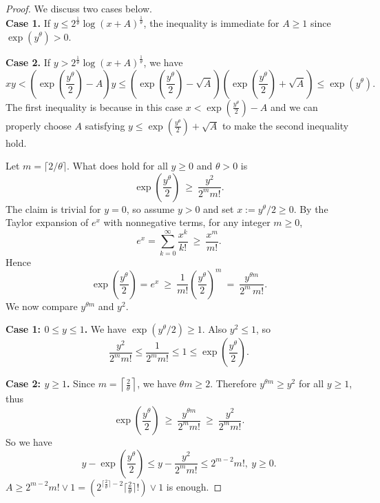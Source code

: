 \documentclass[11pt]{article}
\begin{document}
\begin{proof}
We discuss two cases below.\\ 

\textbf{Case 1.} If $y \leq 2^{\frac{1}{\theta}} \log(x + A)^{\frac{1}{\theta}}$, the inequality is immediate for $A\ge 1$ since $\exp(y^\theta)>0$.

\textbf{Case 2.} If $y > 2^{\frac{1}{\theta}} \log(x+A)^{\frac{1}{\theta}}$, we have
\[
xy < \left(\exp(\frac{y^\theta}{2}) - A \right) y \leq \left(\exp(\frac{y^\theta}{2}) - \sqrt{A} \right)\left(\exp(\frac{y^\theta}{2}) + \sqrt{A}\right) \leq \exp(y^\theta).
\]
The first inequality is because in this case $x<\exp(\frac{y^\theta}{2})-A$ and we can properly choose $A$ satisfying $y\leq \exp(\frac{y^\theta}{2})+\sqrt{A}$ to make the second inequality hold.

Let \(m=\lceil 2/\theta\rceil\). What does hold for all \(y\ge 0\) and \(\theta>0\) is
\[
\exp\left(\frac{y^\theta}{2}\right)\ \ge\ \frac{y^2}{2^mm!}.
\]
The claim is trivial for $y=0$, so assume $y>0$ and set $x:=y^\theta/2\ge 0$.
By the Taylor expansion of $e^x$ with nonnegative terms, for any integer $m\ge 0$,
\[
e^x=\sum_{k=0}^{\infty}\frac{x^k}{k!}\ \ge\ \frac{x^m}{m!}.
\]
Hence
\[
\exp\!\left(\frac{y^\theta}{2}\right)=e^x
\ \ge\ \frac{1}{m!}\left(\frac{y^\theta}{2}\right)^m
\ =\ \frac{y^{\theta m}}{2^m\,m!}.
\]
We now compare $y^{\theta m}$ and $y^2$.

\textbf{Case 1: $0\le y\le 1$.}
We have $\exp(y^\theta/2)\ge 1$. Also $y^2\le 1$, so
\[
\frac{y^2}{2^m m!}\le \frac{1}{2^m m!}\le 1 \le \exp\!\left(\frac{y^\theta}{2}\right).
\]

\textbf{Case 2: $y\ge 1$.}
Since $m=\left\lceil \frac{2}{\theta}\right\rceil$, we have $\theta m\ge 2$.
Therefore $y^{\theta m}\ge y^2$ for all $y\ge 1$, thus
\[
\exp\!\left(\frac{y^\theta}{2}\right)\ \ge\ \frac{y^{\theta m}}{2^m m!}
\ \ge\ \frac{y^2}{2^m m!}.
\]
So we have
\[
y-\exp\left(\frac{y^\theta}{2}\right) \le y-\frac{y^2}{2^mm!}\le 2^{m-2}m!,~y \ge 0.
\]
$A\ge 2^{m-2}m! \vee 1= (2^{\lceil \frac{2}{\theta} \rceil-2} \lceil \frac{2}{\theta} \rceil !)\vee 1$ is enough.

\end{proof}




\end{document}
